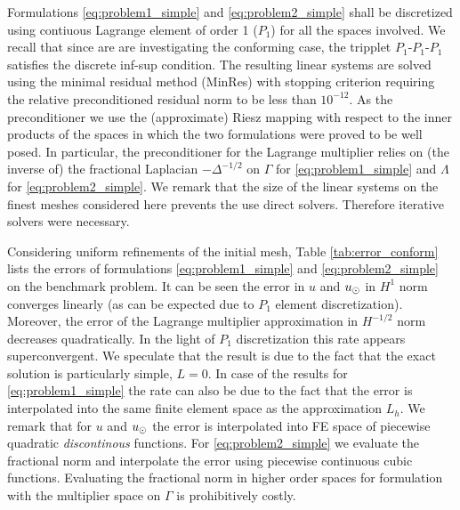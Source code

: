 \documentclass[r]{siamart171218}
\begin{document}
Formulations \eqref{eq:problem1_simple} and \eqref{eq:problem2_simple} shall
be discretized using contiuous Lagrange element of order 1 ($P_1$) for all the spaces
involved. We recall that since are are investigating the conforming case, the tripplet
$P_1$-$P_1$-$P_1$ satisfies
the discrete inf-sup condition. The resulting linear systems are solved
using the minimal residual method (MinRes) with stopping criterion requiring the relative
preconditioned residual norm to be less than $10^{-12}$. As the preconditioner
we use the (approximate) Riesz mapping with respect to the inner products of
the spaces in which the two formulations were proved to be well posed.
In particular, the preconditioner for the Lagrange multiplier relies on
(the inverse of) the fractional Laplacian $-\Delta^{-1/2}$ on $\Gamma$ for
\eqref{eq:problem1_simple} and $\Lambda$ for \eqref{eq:problem2_simple}.
We remark that the size of the linear systems on the finest meshes considered
here prevents the use direct solvers. Therefore iterative solvers were necessary. 

Considering uniform refinements of the initial mesh, Table \ref{tab:error_conform}
lists the errors of formulations \eqref{eq:problem1_simple} and \eqref{eq:problem2_simple}
on the benchmark problem. It can be seen the error in $u$ and $u_{\odot}$ in $H^1$ norm
converges linearly (as can be expected due to $P_1$ element discretization).
Moreover, the error of the Lagrange multiplier approximation in $H^{-1/2}$ norm
decreases quadratically. In the light of $P_1$ discretization this rate appears
superconvergent. We speculate that the result is due to the fact that the
exact solution is particularly simple, $L=0$. In case of the results for
\eqref{eq:problem1_simple} the rate can also be due to the fact that the
error is interpolated into the same finite element space as the approximation $L_h$.
We remark that for $u$ and $u_{\odot}$ the error is interpolated into FE space of piecewise
quadratic \emph{discontinous} functions. For \eqref{eq:problem2_simple} we
evaluate the fractional norm and interpolate the error using piecewise continuous
cubic functions. Evaluating the fractional norm in higher order spaces
for formulation with the multiplier space on $\Gamma$ is prohibitively costly. 
\end{document}
